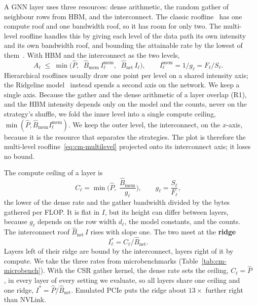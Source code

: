 A GNN layer uses three resources: dense arithmetic, the random gather of neighbour rows from HBM,
and the interconnect. The classic roofline~\cite{williams2009roofline} has one compute roof and
one bandwidth roof, so it has room for only two. The multi-level roofline handles this by giving
each level of the data path its own intensity and its own bandwidth roof, and bounding the
attainable rate by the lowest of them~\cite{ilic2014cacheaware,yang2020hierarchical}. With HBM and
the interconnect as the two levels,
\begin{equation}
  A_\ell \;\le\; \min\!\big(\hat{P},\;\; \hat{B}_{\mathrm{mem}}\, I^{\mathrm{mem}}_\ell,\;\;
           \hat{B}_{\mathrm{net}}\, I_\ell\big),
  \qquad I^{\mathrm{mem}}_\ell = 1/g_\ell = F_\ell / S_\ell .
  \label{eq:cm-multilevel}
\end{equation}
Hierarchical rooflines usually draw one point per level on a shared intensity axis; the Ridgeline
model~\cite{checconi2022ridgeline} instead spends a second axis on the network. We keep a single
axis. Because the gather and the dense arithmetic of a layer overlap (R1), and the HBM intensity
depends only on the model and the counts, never on the strategy's shuffle, we fold the inner
level into a single compute ceiling, $\min(\hat{P}, \hat{B}_{\mathrm{mem}} I^{\mathrm{mem}}_\ell)$.
We keep the outer level, the interconnect, on the $x$-axis, because it is the resource that
separates the strategies. The plot is therefore the multi-level roofline~\eqref{eq:cm-multilevel}
projected onto its interconnect axis; it loses no bound.

The compute ceiling of a layer is
\begin{equation}
  C_\ell = \min\!\Big(\hat{P},\; \frac{\hat{B}_{\mathrm{mem}}}{g_\ell}\Big), \qquad g_\ell = \frac{S_\ell}{F_\ell},
  \label{eq:roof-cmp}
\end{equation}
the lower of the dense rate and the gather bandwidth divided by the bytes gathered per FLOP. It is
flat in $I$, but its height can differ between layers, because $g_\ell$ depends on the row width
$d_\ell$, the model constants, and the counts. The interconnect roof $\hat{B}_{\mathrm{net}}\, I$
rises with slope one. The two meet at the \textbf{ridge}
\begin{equation}
  I^{*}_\ell = C_\ell / \hat{B}_{\mathrm{net}}.
  \label{eq:ridge}
\end{equation}
Layers left of their ridge are bound by the interconnect, layers right of it by compute. We take
the three rates from microbenchmarks (Table~\ref{tab:cm-microbench}). With the CSR gather kernel,
the dense rate sets the ceiling, $C_\ell = \hat{P}$, in every layer of every setting we evaluate,
so all layers share one ceiling and one ridge, $I^{*} = \hat{P}/\hat{B}_{\mathrm{net}}$.
 Emulated PCIe puts the
ridge about $13\times$ further right than NVLink.

